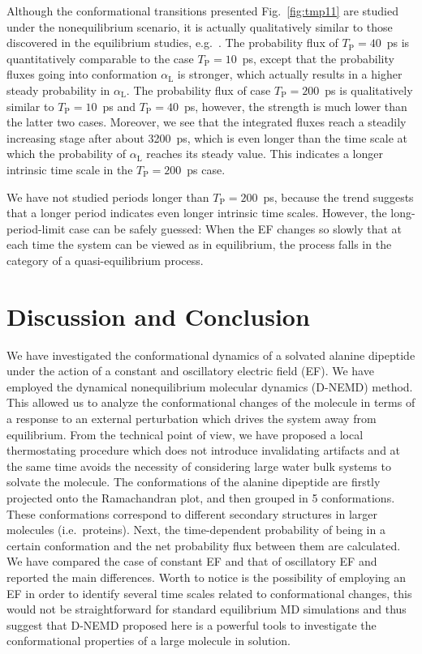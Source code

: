 \documentclass[a4paper,preprint,unsortedaddress,onecolumn]{revtex4-1}
\newcommand{\recheck}[1]{{\color{red} #1}}
\newcommand{\period}[0]{T_{\textrm{P}}}
\newcommand{\confc}[0]{{\alpha_{\textrm{L}}}}
\begin{document}
\recheck{
  Although the conformational transitions presented Fig.~\ref{fig:tmp11} are studied under
  the nonequilibrium scenario, it is actually qualitatively similar to those
  discovered in the equilibrium studies, e.g.~\cite{apostolakis1999calculation, gfeller2007complex}.
}
The probability flux of $\period =40$~ps is quantitatively
comparable to the case $\period =10$~ps, except that the probability fluxes
going into conformation $\confc$ is stronger, which actually results in
a higher steady probability in $\confc$.
The probability flux of case $\period =200$~ps is qualitatively
similar to $\period =10$~ps and $\period =40$~ps, however,
the strength is much lower than the latter two cases.
Moreover, 
  we see that the integrated fluxes reach
  a steadily
increasing stage after about 3200~ps, which is even longer than the time scale
at which the probability of $\confc$ reaches its steady value. This indicates
a longer intrinsic time scale in the $\period =200$~ps case.

We have not studied periods longer than $\period =200$~ps, because
the trend suggests that a longer period indicates even longer intrinsic time scales.
However, the long-period-limit case can be safely guessed: When
the EF changes so slowly that
at each time the system
can be viewed as in equilibrium,
the process falls in the category of a quasi-equilibrium
process. 

\section{Discussion and Conclusion}
We have investigated the conformational
dynamics of a solvated alanine dipeptide under the action of a constant and oscillatory electric
field (EF).
We have employed the dynamical nonequilibrium molecular dynamics
(D-NEMD) method. This allowed us to analyze the conformational changes
of the molecule in terms of a response to an external perturbation
which drives the system away from equilibrium. From the technical
point of view, we have proposed a local thermostating procedure which
does not introduce invalidating artifacts and at the same time avoids
the necessity of considering large water bulk systems to solvate the
molecule.
The conformations of the alanine dipeptide are
firstly projected onto the Ramachandran plot, and
then grouped in 5  conformations.
These conformations
correspond to different secondary structures in larger molecules
(i.e.~proteins).
Next, the time-dependent probability
of being in a certain conformation and the net probability flux
between them are calculated.
We have compared the case of constant EF and that of oscillatory EF
and reported the main differences.
Worth to notice is the possibility of employing an EF in order to identify several time scales related to conformational changes, this would not be straightforward for standard equilibrium MD simulations and thus suggest that D-NEMD proposed here is a powerful tools to investigate the conformational properties of a large molecule in solution.
\end{document}
